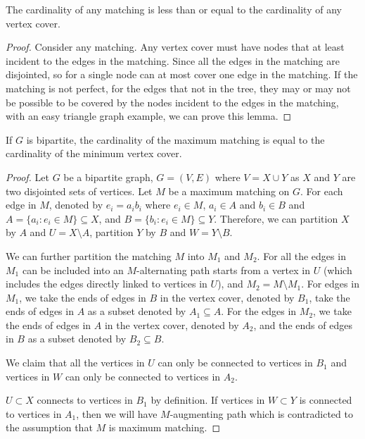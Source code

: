 				\begin{lemma}
					The cardinality of any matching is less than or equal to the cardinality of any vertex cover.
				\end{lemma}

				\begin{proof}
					Consider any matching. Any vertex cover must have nodes that at least incident to the edges in the matching. Since all the edges in the matching are disjointed, so for a single node can at most cover one edge in the matching. If the matching is not perfect, for the edges that not in the tree, they may or may not be possible to be covered by the nodes incident to the edges in the matching, with an easy triangle graph example, we can prove this lemma.
				\end{proof}

				\begin{theorem}
					If $G$ is bipartite, the cardinality of the maximum matching is equal to the cardinality of the minimum vertex cover.
				\end{theorem}

				\begin{proof}
					Let $G$ be a bipartite graph, $G = (V, E)$ where $V = X\cup Y$ as $X$ and $Y$ are two disjointed sets of vertices. Let $M$ be a maximum matching on $G$. For each edge in $M$, denoted by $e_i = a_ib_i$ where $e_i \in M$, $a_i \in A$ and $b_i \in B$ and $A = \{a_i: e_i \in M\} \subseteq X$, and $B = \{b_i: e_i \in M\} \subseteq Y$. Therefore, we can partition $X$ by $A$ and $U = X\setminus A$, partition $Y$ by $B$ and $W = Y\setminus B$.

					We can further partition the matching $M$ into $M_1$ and $M_2$. For all the edges in $M_1$ can be included into an $M$-alternating path starts from a vertex in $U$ (which includes the edges directly linked to vertices in $U$), and $M_2 = M \setminus M_1$. For edges in $M_1$, we take the ends of edges in $B$ in the vertex cover, denoted by $B_1$, take the ends of edges in $A$ as a subset denoted by $A_1 \subseteq A$. For the edges in $M_2$, we take the ends of edges in $A$ in the vertex cover, denoted by $A_2$, and the ends of edges in $B$ as a subset denoted by $B_2 \subseteq B$. 

					We claim that all the vertices in $U$ can only be connected to vertices in $B_1$ and vertices in $W$ can only be connected to vertices in $A_2$.

					$U \subset X$ connects to vertices in $B_1$ by definition. If vertices in $W \subset Y$ is connected to vertices in $A_1$, then we will have $M$-augmenting path which is contradicted to the assumption that $M$ is maximum matching.
				\end{proof}

